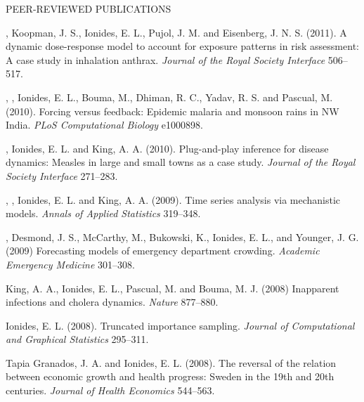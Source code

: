 \begin{reflist}{PEER-REVIEWED PUBLICATIONS}
\item\formal{[[\mayerJRSI] ]} , Koopman, J. S., Ionides, E. L., Pujol, J. M. and  Eisenberg, J. N. S. (2011). A dynamic dose-response model to account for exposure patterns in risk assessment: A case study in inhalation anthrax. {\em Journal of the Royal Society Interface} {}{\separator}506--517.


\item\formal{[[\laneriPLOSCB] ]} , , Ionides, E. L., Bouma, M., Dhiman, R. C., Yadav, R. S. and Pascual, M. (2010).  Forcing versus feedback: Epidemic malaria and monsoon rains in NW India. {\em PLoS Computational Biology} {}{\separator}e1000898.

\item\formal{[[\heJRSI] ]}
, Ionides, E. L. and King, A. A. (2010).
Plug-and-play inference for disease dynamics: Measles in large and small towns as a case study. {\em Journal of the Royal Society Interface} {}{\separator}271--283.


\item\formal{[[\bretoAOAS] ]}
 ,  , Ionides, E. L. and King, A. A. (2009).
Time series analysis via mechanistic models. 
{\em Annals of Applied Statistics} {}{\separator}319--348.

\item\formal{[[\schweiglerAEM] ]}
, Desmond, J. S., McCarthy, M., Bukowski, K., Ionides, E. L., and Younger, J. G. (2009) Forecasting models of emergency department crowding. {\em Academic Emergency Medicine} {}{\separator}301--308.

\item\formal{[[\kingNATURE] ]}
King, A. A., Ionides, E. L., Pascual, M. and Bouma, M. J. (2008) Inapparent infections and cholera dynamics. {\em Nature} {}{\separator}877--880.

\item\formal{[[\ionidesJCGS] ]}
Ionides, E. L. (2008). Truncated importance sampling. {\em Journal of Computational and Graphical Statistics} {}{\separator}295--311.

\item\formal{[[\tapiaJHE] ]} 
Tapia Granados, J. A. and Ionides, E. L. (2008). The reversal of the relation between economic growth and health progress: Sweden in the 19th and 20th centuries. {\em Journal of Health Economics} {}{\separator}544--563.


\end{reflist}
